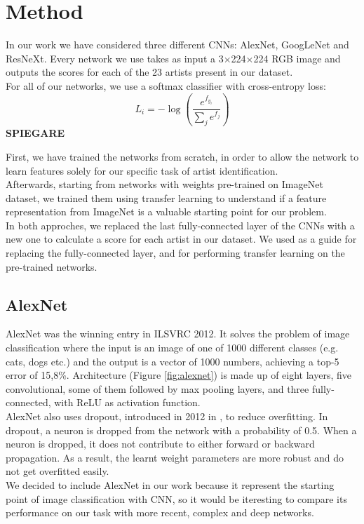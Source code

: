 \documentclass{article}
\begin{document}
\section{Method}\label{method}
In our work we have considered three different CNNs: AlexNet, GoogLeNet and ResNeXt. Every network we use takes as input a
3$\times$224$\times$224 RGB image and outputs the scores for each of the 23 artists present in our dataset.
\\
For all of our networks, we use a softmax classifier with
cross-entropy loss:
\begin{equation}
L_{i}=-\log \left(\frac{e^{f_{y_{i}}}}{\sum_{j} e^{f_{j}}}\right)
\end{equation}
\textbf{SPIEGARE}

First, we have trained the networks from scratch, in order to allow the network to learn features solely for our specific task of artist identification. \\
Afterwards, starting from networks with weights pre-trained on ImageNet dataset, we trained them using transfer learning to understand if a feature representation from ImageNet is a valuable starting point for our problem.\\
In both approches, we replaced the last fully-connected layer of the CNNs with a new one to calculate a score for each artist in
our dataset. We used \cite{pytorchguide} as a guide for replacing the fully-connected layer, and for performing transfer learning on the pre-trained networks.

\subsection{AlexNet}
AlexNet was the winning entry in ILSVRC 2012. It solves the problem of image classification where the input is an image of one of 1000 different classes (e.g. cats, dogs etc.) and the output is a vector of 1000 numbers, achieving a top-5 error of 15,8\%.
Architecture (Figure \ref{fig:alexnet}) is made up of eight layers, five convolutional, some of them followed by max pooling layers, and three fully-connected, with ReLU as activation function.\\
AlexNet also uses dropout, introduced in 2012 in \cite{dropout}, to reduce overfitting. In dropout, a neuron is dropped from the network with a probability of 0.5. When a neuron is dropped, it does not contribute to either forward or backward propagation. 
As a result, the learnt weight parameters are more robust and do not get overfitted easily.\\
We decided to include AlexNet in our work because it represent the starting point of image classification with CNN, so it would be iteresting to compare its performance on our task with more recent, complex and deep networks.
\end{document}
